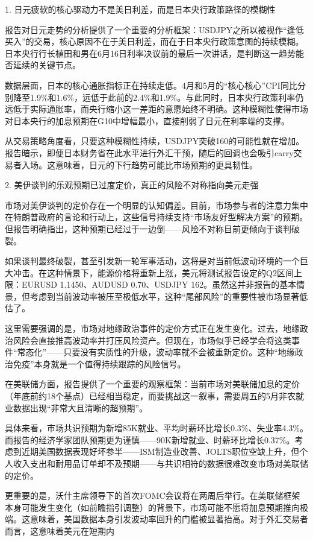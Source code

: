 \documentclass[11pt]{ctexart}
\begin{document}
1. 日元疲软的核心驱动力不是美日利差，而是日本央行政策路径的模糊性

报告对日元走势的分析提供了一个重要的分析框架：USDJPY之所以被视作“逢低买入”的交易，核心原因不在于美日利差，而在于日本央行政策意图的持续模糊。日本央行行长植田和男在6月16日利率决议前的最后一次讲话，是判断这一趋势能否延续的关键节点。

数据层面，日本的核心通胀指标正在持续走低。4月和5月的“核心核心”CPI同比分别降至1.9\%和1.6\%，远低于此前的2.4\%和1.9\%。与此同时，日本央行政策利率仍远低于实际通胀率，而央行缩小这一差距的意愿始终不明确。这种模糊性使得市场对日本央行的加息预期在G10中增幅最小，直接削弱了日元在利率端的支撑。

从交易策略角度看，只要这种模糊性持续，USDJPY突破160的可能性就在增加。报告暗示，即便日本财务省在此水平进行外汇干预，随后的回调也会吸引carry交易者入场。这意味着，日元的下行趋势可能比市场预期的更具韧性。

2. 美伊谈判的乐观预期已过度定价，真正的风险不对称指向美元走强

市场对美伊谈判的定价存在一个明显的认知偏差。目前，市场参与者的注意力集中在特朗普政府的言论和行动上，这些信号持续支持“市场友好型解决方案”的预期。但报告明确指出，这种预期已经过于一边倒——风险不对称目前更倾向于谈判破裂。

如果谈判最终破裂，甚至引发新一轮军事活动，这将是对当前低波动环境的一个巨大冲击。在这种情景下，能源价格将重新上涨，美元将测试报告设定的Q2区间上限：EURUSD 1.1450、AUDUSD 0.70、USDJPY 162。虽然这并非报告的基本情景，但考虑到当前波动率被压至极低水平，这种“尾部风险”的重要性被市场显著低估了。

这里需要强调的是，市场对地缘政治事件的定价方式正在发生变化。过去，地缘政治风险会直接推高波动率并打压风险资产。但现在，市场似乎已经学会将这类事件“常态化”——只要没有实质性的升级，波动率就不会被重新定价。这种“地缘政治免疫”本身就是一个值得持续跟踪的风险信号。

在美联储方面，报告提供了一个重要的观察框架：当前市场对美联储加息的定价（年底前约18个基点）已经相当稳定，而要挑战这一叙事，需要周五的5月非农就业数据出现“非常大且清晰的超预期”。

具体来看，市场共识预期为新增85K就业、平均时薪环比增长0.3\%、失业率4.3\%。而报告的经济学家团队预期更为谨慎——90K新增就业、时薪环比增长0.37\%。考虑到近期美国数据表现好坏参半——ISM制造业改善、JOLTS职位空缺上升，但个人收入支出和耐用品订单却不及预期——与共识相符的数据很难改变市场对美联储的定价。

更重要的是，沃什主席领导下的首次FOMC会议将在两周后举行。在美联储框架本身可能发生变化（如前瞻指引调整）的背景下，市场可能不愿将加息预期推向极端。这意味着，美国数据本身引发波动率回升的门槛被显著抬高。对于外汇交易者而言，这意味着美元在短期内
\end{document}
